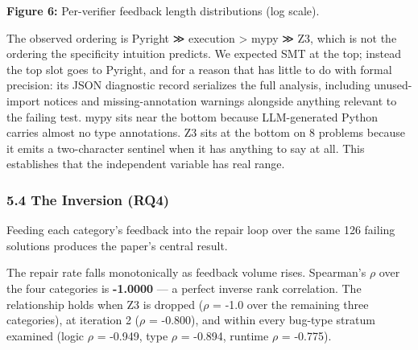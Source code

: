 \textbf{Figure 6:} Per-verifier feedback length distributions (log scale).

The observed ordering is Pyright ≫ execution > mypy ≫ Z3, which is not the ordering the specificity intuition predicts. We expected SMT at the top; instead the top slot goes to Pyright, and for a reason that has little to do with formal precision: its JSON diagnostic record serializes the full analysis, including unused-import notices and missing-annotation warnings alongside anything relevant to the failing test. mypy sits near the bottom because LLM-generated Python carries almost no type annotations. Z3 sits at the bottom on 8 problems because it emits a two-character sentinel when it has anything to say at all. This establishes that the independent variable has real range.

\subsubsection{5.4 The Inversion (RQ4)}

Feeding each category's feedback into the repair loop over the same 126 failing solutions produces the paper's central result.

\begin{table}[htbp]
\centering
{}
\end{table}

The repair rate falls monotonically as feedback volume rises. Spearman's $\rho$ over the four categories is \textbf{-1.0000} --- a perfect inverse rank correlation. The relationship holds when Z3 is dropped ($\rho$ = -1.0 over the remaining three categories), at iteration 2 ($\rho$ = -0.800), and within every bug-type stratum examined (logic $\rho$ = -0.949, type $\rho$ = -0.894, runtime $\rho$ = -0.775).

